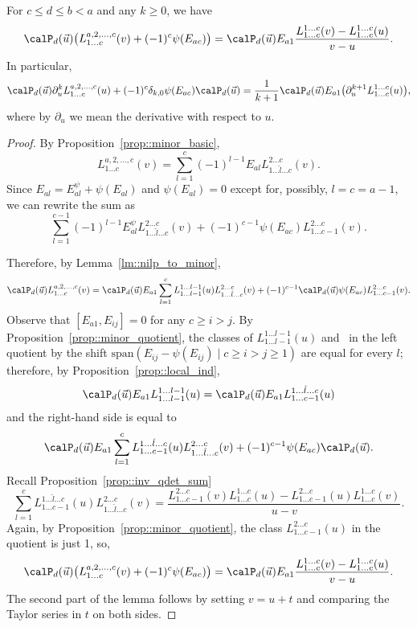 	\begin{Lemma}
		\label{lm::minor_der}
		For $c \leq d \leq b < a$ and any $k\geq 0$, we have
		\[
		\calP_d(\vec{u}) \bigl(L_{1\dots c}^{a,2,\dots,c}(v) + (-1)^c \psi(E_{ac})\bigr) = \calP_d(\vec{u}) E_{a1} \frac{L_{1\dots c}^{1\dots c}(v) - L_{1\dots c}^{1\dots c}(u)}{v-u}.
		\]
		In particular,
		\[
		\calP_d(\vec{u}) \partial_u^k L_{1\dots c}^{a,2,\dots, c}(u) + (-1)^c \delta_{k,0} \psi(E_{ac}) \calP_d(\vec{u})= \frac{1}{k+1} \calP_d(\vec{u}) E_{a1} \bigl(\partial_u^{k+1} L_{1\dots c}^{1\dots c}(u)\bigr),
		\]
		where by $\partial_u$ we mean the derivative with respect to $u$.
		\begin{proof}
			By Proposition~\ref{prop::minor_basic},
			\[
			L_{1\dots c}^{a,2,\dots,c}(v) = \sum\limits_{l=1}^c (-1)^{l-1} E_{al} L_{1\dots \hat{l} \dots c}^{2 \dots c}(v).
			\]
			Since $E_{al} = E_{al}^{\psi} + \psi(E_{al})$ and $\psi(E_{al})=0$ except for, possibly, $l=c=a-1$, we can rewrite the sum as
			\[
			\sum\limits_{l=1}^{c-1} (-1)^{l-1} E^{\psi}_{al} L_{1\dots \hat{l} \dots c}^{2 \dots c}(v) + (-1)^{c-1} \psi(E_{ac}) L_{1\dots c-1}^{2\dots c}(v).
			\]
			
			Therefore, by Lemma~\ref{lm::nilp_to_minor},
			\[
			\calP_d(\vec{u}) L_{1\dots c}^{a,2,\dots, c}(v) = \calP_d(\vec{u}) E_{a1} \sum\limits_{l=1}^c L_{1\dots l-1}^{1\dots l-1}(u) L_{1\dots \hat{l} \dots c}^{2\dots c}(v) + (-1)^{c-1} \calP_d(\vec{u}) \psi(E_{ac}) L_{1\dots c-1}^{2\dots c}(v).
			\]
			Observe that $[E_{a1},E_{ij}]=0$ for any $c\geq i > j$. By Proposition~\ref{prop::minor_quotient}, the classes of $L_{1\dots l-1}^{1\dots l-1}(u)$ and~ in the left quotient by the shift $\mathrm{span}(E_{ij} - \psi(E_{ij})\mid c\geq i > j \geq 1)$ are equal for every $l$; therefore, by Proposition~\ref{prop::local_ind},
			\[
			\calP_d(\vec{u}) E_{a1} L_{1\dots l-1}^{1\dots l-1}(u) = \calP_d(\vec{u}) E_{a1} L_{1\dots c-1}^{1\dots \hat{l} \dots c}(u)
			\]
			and the right-hand side is equal to
			\[
			\calP_d(\vec{u}) E_{a1} \sum\limits_{l=1}^{c} L_{1\dots c-1}^{1\dots \hat{l} \dots c}(u) L_{1\dots \hat{l} \dots c}^{2\dots c}(v) + (-1)^{c-1} \psi(E_{ac}) \calP_d(\vec{u}).
			\]
			Recall Proposition~\ref{prop::inv_qdet_sum}
			\[
			\sum\limits_{l=1}^{c} L_{1\dots c-1}^{1\dots \hat{l} \dots c}(u) L_{1\dots \hat{l} \dots c}^{2\dots c}(v) = \frac{L_{1\dots c-1}^{2\dots c}(v) L_{1\dots c}^{1\dots c}(u) - L_{1\dots c-1}^{2\dots c}(u) L_{1\dots c}^{1\dots c}(v)}{u-v}.
			\]
			Again, by Proposition~\ref{prop::minor_quotient}, the class $L_{1\dots c-1}^{2\dots c}(u)$ in the quotient is just 1, so,
			\[
			\calP_d(\vec{u}) \bigl(L_{1\dots c}^{a,2,\dots,c}(v) + (-1)^c \psi(E_{ac})\bigr) = \calP_d(\vec{u}) E_{a1} \frac{L_{1\dots c}^{1\dots c}(v) - L_{1\dots c}^{1\dots c}(u)}{v-u}.
			\]
			The second part of the lemma follows by setting $v=u+t$ and comparing the Taylor series in $t$ on both sides.
		\end{proof}
	\end{Lemma}
	
